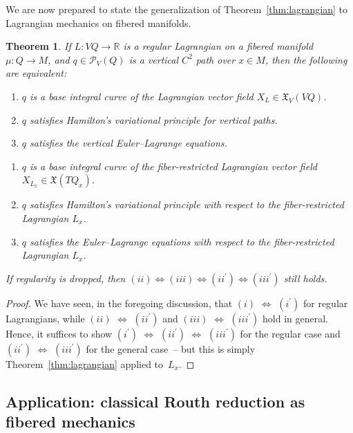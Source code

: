 \documentclass[pdftex]{sigma}
\numberwithin{equation}{section}
\newtheorem{Theorem}{Theorem}[section]
\begin{document}
We are now prepared to state the generalization of Theorem~\ref{thm:lagrangian} to Lagrangian mechanics on f\/ibered manifolds.

\begin{Theorem} \label{thm:fiberedLagrangian}
If $ L \colon V Q \rightarrow \mathbb{R} $ is a regular Lagrangian on a fibered manifold $ \mu \colon Q \rightarrow M $, and $ q \in \mathcal{P} _V (Q) $ is a vertical $ C ^2 $ path over $ x \in M $, then the following are equivalent:
\begin{enumerate}[label={\rm (}\roman*{\rm )}]\itemsep=0pt
\item $q$ is a base integral curve of the Lagrangian vector field $ X _L \in \mathfrak{X} _V ( V Q ) $.
\item $q$ satisfies Hamilton's variational principle for vertical paths.
\item $q$ satisfies the vertical Euler--Lagrange equations.
\end{enumerate}
\begin{enumerate}[label={\rm (}\roman*$\,{}^\prime${\rm )}]\itemsep=0pt
\item $q$ is a base integral curve of the fiber-restricted Lagrangian vector field $ X _{ L _x } \in \mathfrak{X} ( T Q _x ) $.
\item $q$ satisfies Hamilton's variational principle with respect to the fiber-restricted Lagrangian $ L _x $.
\item $q$ satisfies the Euler--Lagrange equations with respect to the fiber-restricted Lagrangian $ L _x $.
\end{enumerate}
If regularity is dropped, then $ ( ii ) \Leftrightarrow ( iii ) \Leftrightarrow ( ii ^\prime )\Leftrightarrow ( iii ^\prime ) $ still holds.
\end{Theorem}

\begin{proof}
We have seen, in the foregoing discussion, that $(i)$ $ \Leftrightarrow $ $(i ^\prime)$ for regular Lagrangians, while $(ii)$ $ \Leftrightarrow $ $(ii ^\prime)$ and $(iii)$ $ \Leftrightarrow $ $(iii ^\prime)$ hold in general. Hence, it suf\/f\/ices to show $(i ^\prime)$ $ \Leftrightarrow $ $(ii ^\prime)$ $ \Leftrightarrow $ $(iii ^\prime)$ for the regular case and $(ii ^\prime)$ $ \Leftrightarrow $ $(iii ^\prime)$ for the general case~-- but this is simply Theorem~\ref{thm:lagrangian} applied to~$L _x$.
\end{proof}

\subsection{Application: classical Routh reduction as f\/ibered mechanics}
\end{document}
